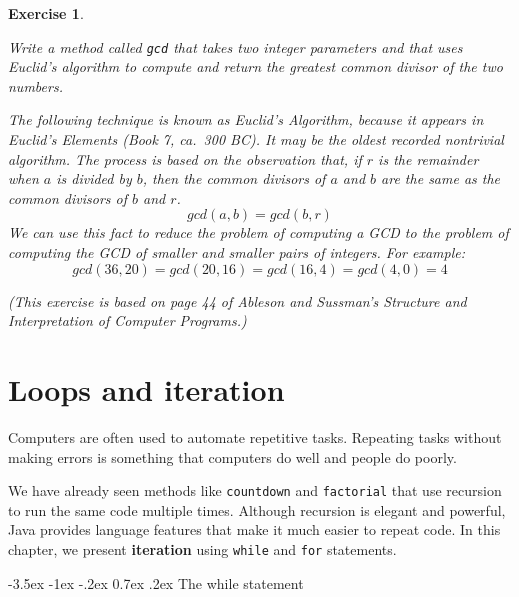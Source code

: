 \documentclass[12pt]{book}
\makeatletter
\theoremstyle{exercise}
\newtheorem{exercise}{Exercise}[chapter]
\newcommand{\java}[1]{\verb"#1"}
\renewcommand{\section}{\@startsection{section}{1}{\z@}%
    {-3.5ex \@plus -1ex \@minus -.2ex}%
    {0.7ex \@plus.2ex}%
    {\normalfont\Large\bfseries}}
\newcommand{\java}[1]{\lstinline{#1}} %
\makeatother
\begin{document}
\begin{exercise}
\label{gcd}

Write a method called \java{gcd} that takes two integer parameters and that uses Euclid's algorithm to compute and return the greatest common divisor of the two numbers.

The following technique is known as Euclid's Algorithm, because it appears in Euclid's {\em Elements} (Book 7, ca.~300 BC).
It may be the oldest recorded nontrivial algorithm.
The process is based on the observation that, if $r$ is the remainder when $a$ is divided by $b$, then the common divisors of $a$ and $b$ are the same as the common divisors of $b$ and $r$.
\[ gcd(a, b) = gcd(b, r) \]
%
We can use this fact to reduce the problem of computing a GCD to the problem of computing the GCD of smaller and smaller pairs of integers.
For example:
\[ gcd(36, 20) = gcd(20, 16) = gcd(16, 4) = gcd(4, 0) = 4 \]


(This exercise is based on page 44 of Ableson and Sussman's {\em Structure and Interpretation of Computer Programs}.)

\end{exercise}


\chapter{Loops and iteration}

Computers are often used to automate repetitive tasks.
Repeating tasks without making errors is something that computers do well and people do poorly.


We have already seen methods like \java{countdown} and \java{factorial} that use recursion to run the same code multiple times.
Although recursion is elegant and powerful, Java provides language features that make it much easier to repeat code.
In this chapter, we present {\bf iteration} using \java{while} and \java{for} statements.


\section{The while statement}

\end{document}
